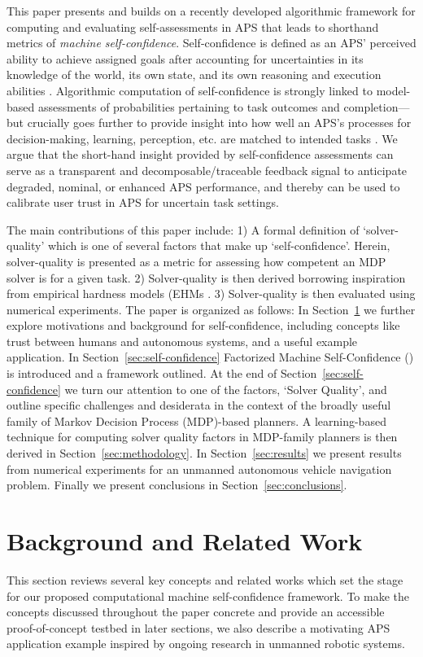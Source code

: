 This paper presents and builds on a recently developed algorithmic framework for computing and evaluating self-assessments in APS that leads to shorthand metrics of \emph{machine self-confidence}. Self-confidence is defined as an APS' perceived ability to achieve assigned goals after accounting for uncertainties in its knowledge of the world, its own state, and its own reasoning and execution abilities \cite{Aitken2016-cv, Aitken2016-fb, Sweet2016-tz}. 
Algorithmic computation of self-confidence is strongly linked to model-based assessments of probabilities pertaining to task outcomes and completion---but crucially goes further to provide insight into how well an APS's processes for decision-making, learning, perception, etc. are matched to intended tasks \cite{Hutchins2015-if}. 
We argue that the short-hand insight provided by self-confidence assessments can serve as a transparent and decomposable/traceable feedback signal to anticipate degraded, nominal, or enhanced APS performance, %
and thereby can be used to calibrate user trust in APS for uncertain task settings. 

The main contributions of this paper include: 1) A formal definition of `solver-quality' which is one of several factors that make up `self-confidence'. Herein, solver-quality is presented as a metric for assessing how competent an MDP solver is for a given task. 2) Solver-quality is then derived borrowing inspiration from empirical hardness models (EHMs \cite{Leyton-Brown2009-yr}. 3) Solver-quality is then evaluated using numerical experiments. The paper is organized as follows: In Section~\ref{sec:background} we further explore motivations and background for self-confidence, including concepts like trust between humans and autonomous systems, and a useful example application. In Section~\ref{sec:self-confidence} Factorized Machine Self-Confidence (\famsec) is introduced and a framework outlined. At the end of Section~\ref{sec:self-confidence} we turn our attention to one of the \famsec{} factors, `Solver Quality', and outline specific challenges and desiderata in the context of the broadly useful family of Markov Decision Process (MDP)-based planners. A learning-based technique for computing solver quality factors in MDP-family planners is then derived in Section~\ref{sec:methodology}. In Section~\ref{sec:results} we present results from numerical experiments for an unmanned autonomous vehicle navigation problem. Finally we present conclusions in Section~\ref{sec:conclusions}.

\section{Background and Related Work} \label{sec:background}
This section reviews several key concepts and related works which set the stage for our proposed computational machine self-confidence framework. To make the concepts discussed throughout the paper concrete and provide an accessible proof-of-concept testbed in later sections, we also describe a motivating APS application example inspired by ongoing research in unmanned robotic systems.  

